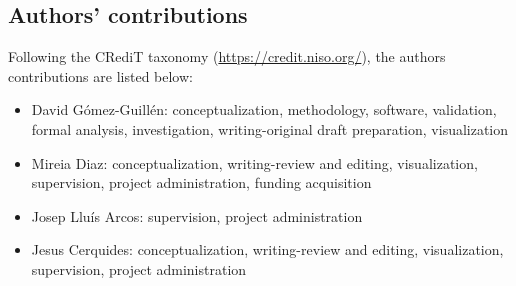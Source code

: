 \documentclass[sn-mathphys,Numbered]{sn-jnl}%
\begin{document}
\subsection*{Authors' contributions}
Following the CRediT taxonomy (\url{https://credit.niso.org/}), the authors contributions are listed below:
\begin{itemize}
	\item David Gómez-Guillén: conceptualization, methodology, software, validation, formal analysis, investigation, writing-original draft preparation, visualization
	\item Mireia Diaz: conceptualization, writing-review and editing, visualization, supervision, project administration, funding acquisition
	\item Josep Lluís Arcos: supervision, project administration
	\item Jesus Cerquides: conceptualization, writing-review and editing, visualization, supervision, project administration
\end{itemize}

\end{document}
